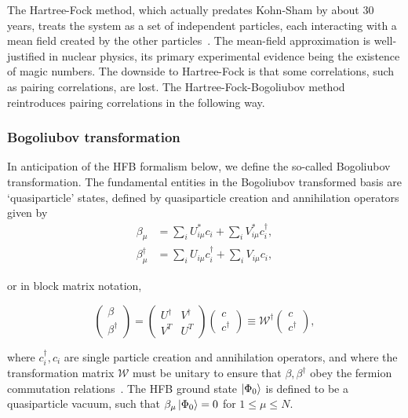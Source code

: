 The Hartree-Fock method, which actually predates Kohn-Sham by about 30 years, treats the system as a set of independent particles, each interacting with a mean field created by the other particles~\cite{Ring1980}. The mean-field approximation is well-justified in nuclear physics, its primary experimental evidence being the existence of magic numbers. The downside to Hartree-Fock is that some correlations, such as pairing correlations, are lost. The Hartree-Fock-Bogoliubov method reintroduces pairing correlations in the following way.

\subsubsection{Bogoliubov transformation}

In anticipation of the HFB formalism below, we define the so-called Bogoliubov transformation. The fundamental entities in the Bogoliubov transformed basis are `quasiparticle' states, defined by quasiparticle creation and annihilation operators given by
\begin{align}
\beta_\mu &= \sum_i U^*_{i\mu}c_i + \sum_i V^*_{i\mu}c_i^\dagger, \\
\beta_\mu^\dagger &= \sum_i U_{i\mu}c_i^\dagger + \sum_i V_{i\mu}c_i,
\end{align}

\noindent or in block matrix notation,

\begin{equation}
\left(\begin{array}{c} \beta \\ \beta^\dagger\end{array}\right) = 
\left(\begin{array}{cc} U^\dagger & V^\dagger \\ V^T & U^T \end{array}\right)
\left(\begin{array}{c} c \\ c^\dagger\end{array}\right)
\equiv \mathcal{W}^\dagger \left(\begin{array}{c} c \\ c^\dagger\end{array}\right),
\end{equation}

\noindent where $c_i^\dagger, c_i$ are single particle creation and annihilation operators, and where the transformation matrix $\mathcal{W}$ must be unitary to ensure that $\beta, \beta^\dagger$ obey the fermion commutation relations~\cite{Ring1980}. The HFB ground state $\ket{\Phi_0}$ is defined to be a quasiparticle vacuum, such that $\beta_\mu\ket{\Phi_0}=0$ for $1\leq\mu\leq N$.

